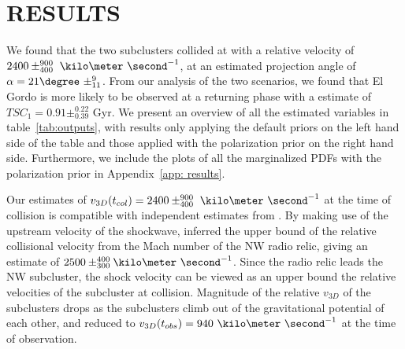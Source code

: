 %


\section{RESULTS} 
We found that the two subclusters collided at with a relative velocity of 
$2400\pm^{900}_{400}~\kilo\meter~\second^{-1}$, at an estimated projection
angle of $\alpha = 21\degree~\pm^{9}_{11}$. From our analysis of the two
scenarios, we found that El Gordo is more likely to be observed at a returning
phase with a estimate of $TSC_1 = 0.91\pm^{0.22}_{0.39}$ Gyr. We present an
overview of all the estimated variables in table~\ref{tab:outputs}, with
results only applying the default priors on the left hand side of the table
and those applied with the polarization prior on the right hand side.
Furthermore, we include the plots of all the marginalized PDFs with the
polarization prior in Appendix~\ref{app: results}. \par 
Our estimates of $v_{3D}(t_{col}) = 2400\pm^{900}_{400}~\kilo\meter~\second^{-1}$ at the time of collision is compatible with independent estimates from \citealt{L13}. 
By making use of the upstream velocity of the shockwave, \cite{L13}
inferred the upper bound of the relative collisional velocity from the Mach
number of the NW radio relic, giving an estimate of $2500
\pm^{400}_{300}\kilo\meter~\second^{-1}$. Since the radio relic leads the
NW subcluster, the shock velocity can be viewed as an upper bound the
relative velocities of the subcluster at collision. Magnitude of the
relative $v_{3D}$ of the subclusters drops as the subclusters climb out of the gravitational potential of each
other, and reduced to $v_{3D}(t_{obs}) = 940~\kilo\meter~\second^{-1}$ at
the time of observation. 



